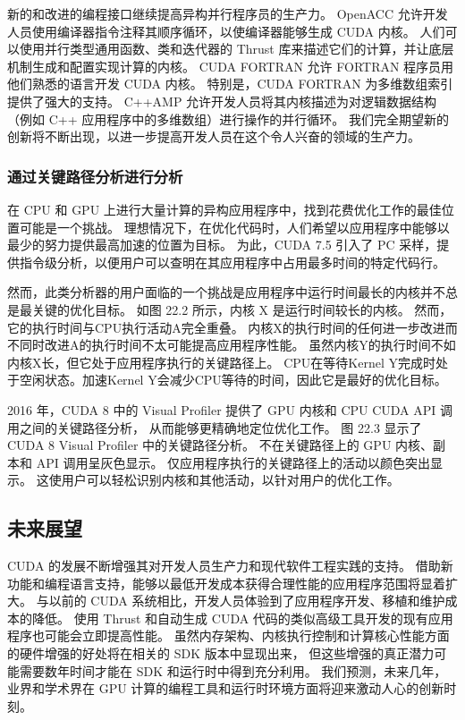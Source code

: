 新的和改进的编程接口继续提高异构并行程序员的生产力。 
OpenACC 允许开发人员使用编译器指令注释其顺序循环，以使编译器能够生成 CUDA 内核。 
人们可以使用并行类型通用函数、类和迭代器的 Thrust 库来描述它们的计算，并让底层机制生成和配置实现计算的内核。 
CUDA FORTRAN 允许 FORTRAN 程序员用他们熟悉的语言开发 CUDA 内核。 
特别是，CUDA FORTRAN 为多维数组索引提供了强大的支持。 
C++AMP 允许开发人员将其内核描述为对逻辑数据结构（例如 C++ 应用程序中的多维数组）进行操作的并行循环。 
我们完全期望新的创新将不断出现，以进一步提高开发人员在这个令人兴奋的领域的生产力。

\subsubsection{通过关键路径分析进行分析}
在 CPU 和 GPU 上进行大量计算的异构应用程序中，找到花费优化工作的最佳位置可能是一个挑战。 
理想情况下，在优化代码时，人们希望以应用程序中能够以最少的努力提供最高加速的位置为目标。 
为此，CUDA 7.5 引入了 PC 采样，提供指令级分析，以便用户可以查明在其应用程序中占用最多时间的特定代码行。

然而，此类分析器的用户面临的一个挑战是应用程序中运行时间最长的内核并不总是最关键的优化目标。 
如图 22.2 所示，内核 X 是运行时间较长的内核。 然而，它的执行时间与CPU执行活动A完全重叠。
内核X的执行时间的任何进一步改进而不同时改进A的执行时间不太可能提高应用程序性能。 
虽然内核Y的执行时间不如内核X长，但它处于应用程序执行的关键路径上。 
CPU在等待Kernel Y完成时处于空闲状态。加速Kernel Y会减少CPU等待的时间，因此它是最好的优化目标。

2016 年，CUDA 8 中的 Visual Profiler 提供了 GPU 内核和 CPU CUDA API 调用之间的关键路径分析，
从而能够更精确地定位优化工作。 图 22.3 显示了 CUDA 8 Visual Profiler 中的关键路径分析。 
不在关键路径上的 GPU 内核、副本和 API 调用呈灰色显示。 仅应用程序执行的关键路径上的活动以颜色突出显示。 
这使用户可以轻松识别内核和其他活动，以针对用户的优化工作。

\subsection{未来展望}
CUDA 的发展不断增强其对开发人员生产力和现代软件工程实践的支持。 
借助新功能和编程语言支持，能够以最低开发成本获得合理性能的应用程序范围将显着扩大。 
与以前的 CUDA 系统相比，开发人员体验到了应用程序开发、移植和维护成本的降低。 
使用 Thrust 和自动生成 CUDA 代码的类似高级工具开发的现有应用程序也可能会立即提高性能。 
虽然内存架构、内核执行控制和计算核心性能方面的硬件增强的好处将在相关的 SDK 版本中显现出来，
但这些增强的真正潜力可能需要数年时间才能在 SDK 和运行时中得到充分利用。 
我们预测，未来几年，业界和学术界在 GPU 计算的编程工具和运行时环境方面将迎来激动人心的创新时刻。